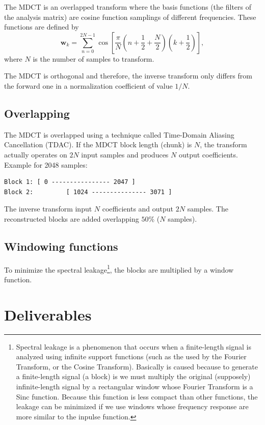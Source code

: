 The MDCT is an overlapped transform where the basis functions (the
filters of the analysis matrix) are cosine function samplings of
different frequencies. These functions are defined by
\begin{equation}
  \mathbf{w}_k = \sum_{n=0}^{2N-1}\cos\left[\frac{\pi}{N} \left(n + \frac{1}{2} + \frac{N}{2}\right) \left(k + \frac{1}{2}\right) \right],
\end{equation}
where $N$ is the number of samples to transform.

The MDCT is orthogonal and therefore, the inverse transform only
differs from the forward one in a normalization coefficient of value
$1/N$.

\subsection{Overlapping}
The MDCT is overlapped using a technique called Time-Domain Aliasing
Cancellation (TDAC). If the MDCT block length (chunk) is $N$, the transform
actually operates on $2N$ input samples and produces $N$ output
coefficients. Example for 2048 samples:

\begin{verbatim}
Block 1: [ 0 ---------------- 2047 ]
Block 2:         [ 1024 --------------- 3071 ]
\end{verbatim}

The inverse transform input $N$ coefficients and output $2N$
samples. The reconstructed blocks are added overlapping $50\%$ ($N$
samples).

\subsection{Windowing functions}
To minimize the spectral leakage\footnote{Spectral leakage is a
phenomenon that occurs when a finite-length signal is analyzed using
infinite support functions (such as the used by the Fourier Transform,
or the Cosine Transform). Basically is caused because to generate a
finite-length signal (a block) is we must multiply the original
(supposely) infinite-length signal by a rectangular window whose
Fourier Transform is a Sinc function. Because this function is less
compact than other functions, the leakage can be minimized if we use
windows whose frequency response are more similar to the inpulse
function.}, the blocks are multiplied by a window function.

\section{Deliverables}


